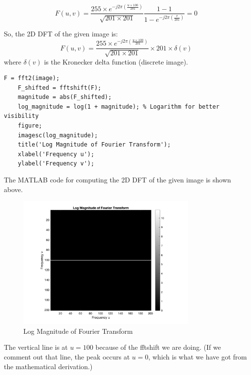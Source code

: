 \documentclass[12pt]{article}
\begin{document}
\begin{equation}
    F(u, v) = \frac{255\times e^{-j2\pi\left(\frac{u\times 100}{201}\right)}}{\sqrt{201\times 201}} \frac{1-1}{1-e^{-j2\pi\left(\frac{v}{201}\right)}} = 0
\end{equation}

So, the 2D DFT of the given image is:
\begin{equation}
    F(u, v) = \frac{255\times e^{-j2\pi\left(\frac{u\times 100}{201}\right)}}{\sqrt{201\times 201}} \times 201 \times \delta(v)
\end{equation}
where $\delta(v)$ is the Kronecker delta function (discrete image).
\begin{lstlisting}[style=Matlab,caption={MATLAB code for Fourier Transform}]    
    F = fft2(image);
    F_shifted = fftshift(F);
    magnitude = abs(F_shifted);
    log_magnitude = log(1 + magnitude); % Logarithm for better visibility
    figure;
    imagesc(log_magnitude);
    title('Log Magnitude of Fourier Transform');
    xlabel('Frequency u');
    ylabel('Frequency v');
\end{lstlisting}

\clearpage
The MATLAB code for computing the 2D DFT of the given image is shown above.


\begin{figure}
    \centering
    \includegraphics[width=0.8\textwidth]{../images/fourier_log_magnitude_image.png}
    \caption{Log Magnitude of Fourier Transform}
    \label{fig:fft}
\end{figure}


The vertical line is at $u = 100$ because of the fftshift we are doing. (If we comment out that line, the peak occurs at $u = 0$, which is what we have got from the mathematical derivation.)
\end{document}
